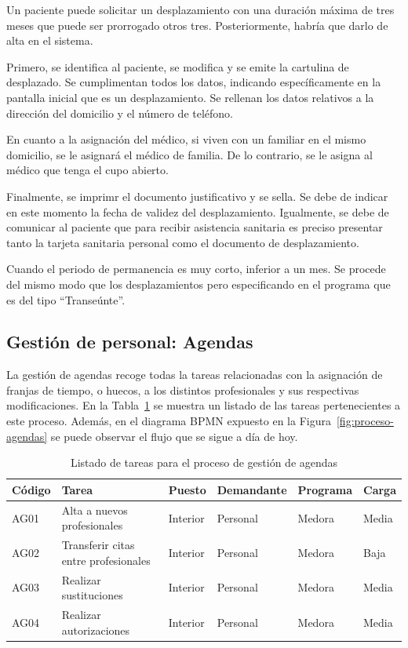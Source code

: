 Un paciente puede solicitar un desplazamiento con una duración máxima de tres meses que puede ser prorrogado otros tres.
Posteriormente, habría que darlo de alta en el sistema.

Primero, se identifica al paciente, se modifica y se emite la cartulina de desplazado.
Se cumplimentan todos los datos, indicando específicamente en la pantalla inicial que es un desplazamiento.
Se rellenan los datos relativos a la dirección del domicilio y el número de teléfono.

En cuanto a la asignación del médico, si viven con un familiar en el mismo domicilio, se le asignará el médico de familia.
De lo contrario, se le asigna al médico que tenga el cupo abierto.

Finalmente, se imprimr el documento justificativo y se sella.
Se debe de indicar en este momento la fecha de validez del desplazamiento.
Igualmente, se debe de comunicar al paciente que para recibir asistencia sanitaria es preciso presentar tanto la tarjeta sanitaria personal como el documento de desplazamiento.

Cuando el periodo de permanencia es muy corto, inferior a un mes.
Se procede del mismo modo que los desplazamientos pero especificando en el programa que es del tipo ``Transeúnte''.

\subsection{Gestión de personal: Agendas}

La gestión de agendas recoge todas la tareas  relacionadas con la asignación de franjas de tiempo, o huecos, a los distintos profesionales y sus respectivas modificaciones. En la Tabla~\ref{tab:proceso-agendas} se muestra un listado de las tareas pertenecientes a este proceso. Además, en el diagrama BPMN expuesto en la Figura~\ref{fig:proceso-agendas} se puede observar el flujo que se sigue a día de hoy.

\begin{table}[H]
    \begin{tabular}{lp{5cm}llll}
        \toprule
        Código & Tarea                                & Puesto   & Demandante & Programa & Carga \\
        \midrule
        AG01   & Alta a nuevos profesionales          & Interior & Personal   & Medora   & Media \\
        AG02   & Transferir citas entre profesionales & Interior & Personal   & Medora   & Baja  \\
        AG03   & Realizar sustituciones               & Interior & Personal   & Medora   & Media \\
        AG04   & Realizar autorizaciones              & Interior & Personal   & Medora   & Media \\
        \bottomrule
    \end{tabular}
    \caption{Listado de tareas para el proceso de gestión de agendas}
    \label{tab:proceso-agendas}
\end{table}

